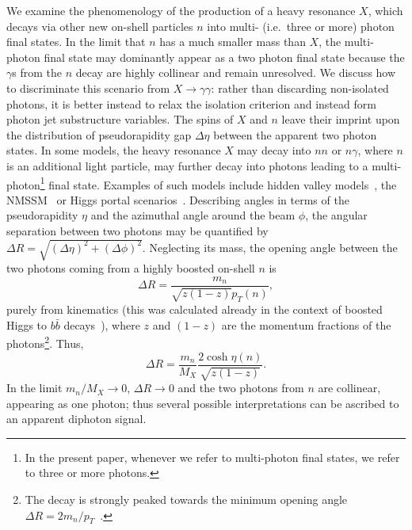 We examine the phenomenology of the production of a heavy resonance $X$, 
which decays via other new on-shell particles $n$ into multi- (i.e.\ three
or more) photon final states.  In the limit that $n$ has a much smaller mass than $X$, 
the multi-photon final state may dominantly appear as a two photon
final state because the $\gamma$s from the $n$ decay are highly
collinear and remain unresolved.
We discuss how to discriminate this scenario
from $X \rightarrow \gamma \gamma$: rather than discarding non-isolated
photons, it is better instead to relax the isolation criterion and instead
form photon 
jet substructure variables. 
The spins of $X$ and $n$ leave their imprint upon
the distribution of pseudorapidity gap $\Delta \eta$ between the apparent two
photon 
states. In some models, the heavy resonance $X$ may decay into $nn$ or $n \gamma$, where
$n$ is an additional light
particle,
may further decay into photons leading to a multi-photon\footnote{In the
  present paper, whenever we refer to multi-photon final states, we refer to
  three or more photons.} final state. 
Examples of such models include hidden
valley models~\cite{Strassler:2006im,Strassler:2006ri}, the
NMSSM~\cite{Ellwanger:2009dp} or Higgs portal
scenarios~\cite{Schabinger:2005ei}. 
Describing angles in terms of the pseudorapidity $\eta$ and the azimuthal
angle around the beam $\phi$, the angular separation between two photons may be 
quantified by $\Delta R=\sqrt{(\Delta \eta)^2+(\Delta \phi)^2}$. 
Neglecting its mass, 
the opening angle between the two photons coming from a highly boosted
on-shell $n$ is 
\begin{equation}\Delta  R=\frac{m_n}{\sqrt{z(1-z)}p_T(n)},
\end{equation} purely from kinematics (this was
  calculated already in the context of boosted Higgs to $b \bar b$
  decays~\cite{Butterworth:2008iy}),
  where $z$ and 
 $(1-z)$ are  the momentum fractions of the photons\footnote{The decay is
   strongly peaked towards the minimum opening angle $\Delta R=2
   m_n/p_T$~\protect\cite{Chala:2015cev}.}. 
 Thus,
\begin{equation}
\Delta R = \frac{m_n}{M_X}\frac{2 \cosh \eta(n)}{\sqrt{z(1-z)}}. \label{eq:dRest}
\end{equation}
In the limit $m_n/M_X\rightarrow 0$, $\Delta
R\rightarrow 0$ and the two photons from $n$ are 
collinear, appearing as one photon; thus several possible interpretations
can be ascribed to an apparent diphoton signal.

